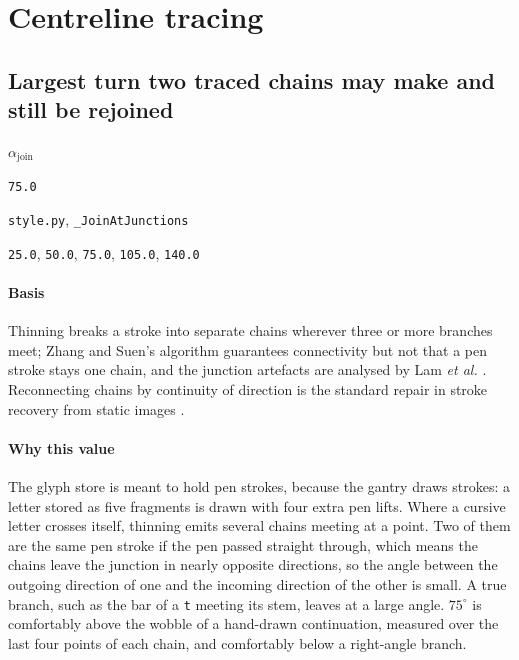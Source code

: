 \section{Centreline tracing}

\subsection{Largest turn two traced chains may make and still be rejoined}

\label{coef:join-angle}

\begin{description}[leftmargin=5.2em,style=sameline]

\item[Symbol] $\alpha_{\text{join}}$

\item[Value] \texttt{75.0}

\item[Source] \texttt{style.py}, \texttt{\_JoinAtJunctions}

\item[Swept] \texttt{25.0}, \texttt{50.0}, \texttt{75.0}, \texttt{105.0}, \texttt{140.0}

\end{description}

\paragraph{Basis}

Thinning breaks a stroke into separate chains wherever three or more branches meet; Zhang and Suen's algorithm \cite{zhang1984} guarantees connectivity but not that a pen stroke stays one chain, and the junction artefacts are analysed by Lam \textit{et al.} \cite{lam1992}. Reconnecting chains by continuity of direction is the standard repair in stroke recovery from static images \cite{plamondon2000}.

\paragraph{Why this value}

The glyph store is meant to hold pen strokes, because the gantry draws strokes: a letter stored as five fragments is drawn with four extra pen lifts. Where a cursive letter crosses itself, thinning emits several chains meeting at a point. Two of them are the same pen stroke if the pen passed straight through, which means the chains leave the junction in nearly opposite directions, so the angle between the outgoing direction of one and the incoming direction of the other is small. A true branch, such as the bar of a \texttt{t} meeting its stem, leaves at a large angle. $75^\circ$ is comfortably above the wobble of a hand-drawn continuation, measured over the last four points of each chain, and comfortably below a right-angle branch.

